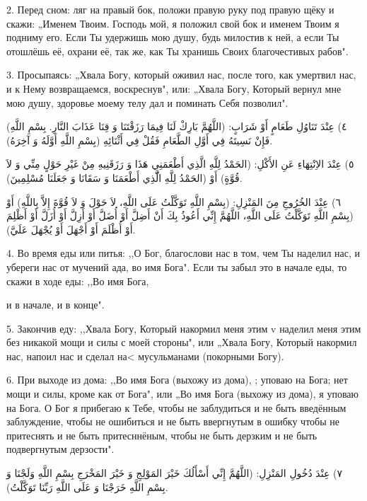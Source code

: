 \documentclass[a5paper]{article}
\begin{document}
2. Перед сном: ляг на правый бок, положи правую руку под правую щёку и скажи: „Именем Твоим. Господь мой, я положил свой бок и именем Твоим я подниму его. Если Ты удержишь мою душу, будь милостив к ней, а если Ты отошлёшь её, охрани её, так же, как Ты хранишь Своих благочестивых рабов".

3. Просыпаясь: „Хвала Богу, который оживил нас, после того, как умертвил нас, и к Нему возвращаемся, воскреснув", или: „Хвала Богу, Который вернул мне мою душу, здоровье моему телу дал и поминать Себя позволил".

٤) عِنْدَ تَنَاوُلِ طَعَامٍ أَوْ شَرَابٍ: (اللَّهُمَّ بَارِكْ لَنَا فِيمَا رَزَقْتَنَا وَ قِنَا عَذَابَ النَّارِ. بِسْمِ اللَّهِ) فَإِنْ نَسِيتَهُ فِي أَوَّلِ الطَّعَامِ فَقُلْ فِي أَثْنَائِهِ (بِسْمِ اللَّهِ أَوَّلَهُ وَ آخِرَهُ).

٥) عِنْدَ الاِنْتِهَاءِ عَنِ الأَكْلِ: (الحَمْدُ لِلَّهِ الَّذِي أَطْعَمَنِي هَذَا وَ رَزَقَنِيهِ مِنْ غَيْرِ حَوْلٍ مِنِّي وَ لاَ قُوَّةٍ) أَوْ (الحَمْدُ لِلَّهِ الَّّذِي أَطْعَمَنَا وَ سَقَانَا وَ جَعَلَنَا مُسْلِمِينَ).

٦) عِنْدَ الخُرُوجِ مِنَ المَنْزِلِ: (بِسْمِ اللَّهِ تَوَكَّلْتُ عَلَى اللَّهِ، لاَ حَوْلَ وَ لاَ قُوَّةَ إِلاَّ بِاللَّهِ) أَوْ (بِسْمِ اللَّهِ تَوَكَّلْتُ عَلَى اللَّهِ، اللَّهُمَّ إِنِّي أَعُوذُ بِكَ أَنْ أَضِلَّ أَوْ أُضَلَّ أَوْ أَزِلَّ أَوْ أُزَلَّ أَوْ أَظْلِمَ أَوْ أُظْلَمَ أَوْ أَجْهَلَ أَوْ يُجْهَلَ عَلَيَّ).

4. Во время еды или питья: ,,О Бог, благослови нас в том, чем Ты наделил нас, и убереги нас от мучений ада, во имя Бога". Если ты забыл это в начале еды, то скажи в ходе еды: ,,Во имя Бога,

и в начале, и в конце".

5. Закончив еду: ,,Хвала Богу, Который накормил меня этим v наделил меня этим без никакой мощи и силы с моей стороны", или „Хвала Богу, Который накормил нас, напоил нас и сделал на< мусульманами (покорными Богу).

6. При выходе из дома: ,,Во имя Бога (выхожу из дома), ; уповаю на Бога; нет мощи и силы, кроме как от Бога", или „Во имя Бога (выхожу из дома), я уповаю на Бога. О Бог я прибегаю к Тебе, чтобы не заблудиться и не быть введённым заблуждение, чтобы не ошибиться и не быть ввергнутым в ошибку чтобы не притеснять и не быть притесннёным, чтобы не быть дерзким и не быть подвергнутым дерзости".

٧) عِنْدَ دُخُولِ المَنْزِلِ: (اللَّهُمَّ إِنِّي أَسْأَلُكَ خَيْرَ المَوْلِجِ وَ خَيْرَ المَخْرَجِ بِسْمِ اللَّهِ وَلَجْنَا وَ بِسْمِ اللَّهِ خَرَجْنَا وَ عَلَى اللَّهِ رَبِّنَا تَوَكَّلْتُ).
\end{document}
